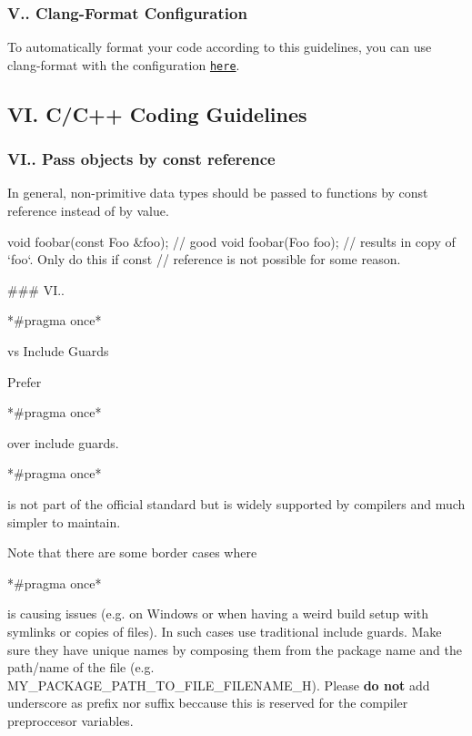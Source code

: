 \subsubsection*{V.. Clang-\/\+Format Configuration}

To automatically format your code according to this guidelines, you can use clang-\/format with the configuration \href{https://github.com/machines-in-motion/mpi_cmake_modules/blob/master/python/mpi_cmake_modules/_clang-format}{\tt here}.

\subsection*{VI. C/\+C++ Coding Guidelines}

\subsubsection*{V\+I.. Pass objects by const reference}

In general, non-\/primitive data types should be passed to functions by const reference instead of by value.


\begin{DoxyCode}
\textcolor{keywordtype}{void} foobar(\textcolor{keyword}{const} Foo &foo);  \textcolor{comment}{// good}
\textcolor{keywordtype}{void} foobar(Foo foo);  \textcolor{comment}{// results in copy of `foo`. Only do this if const}
                       \textcolor{comment}{// reference is not possible for some reason.}
\end{DoxyCode}


\#\#\# V\+I..
\begin{DoxyCode}
*#pragma once* 
\end{DoxyCode}
 vs Include Guards

Prefer
\begin{DoxyCode}
*#pragma once* 
\end{DoxyCode}
 over include guards. 
\begin{DoxyCode}
*#pragma once* 
\end{DoxyCode}
 is not part of the official standard but is widely supported by compilers and much simpler to maintain.

Note that there are some border cases where
\begin{DoxyCode}
*#pragma once* 
\end{DoxyCode}
 is causing issues (e.\+g. on Windows or when having a weird build setup with symlinks or copies of files). In such cases use traditional include guards. Make sure they have unique names by composing them from the package name and the path/name of the file (e.\+g. M\+Y\+\_\+\+P\+A\+C\+K\+A\+G\+E\+\_\+\+P\+A\+T\+H\+\_\+\+T\+O\+\_\+\+F\+I\+L\+E\+\_\+\+F\+I\+L\+E\+N\+A\+M\+E\+\_\+H). Please {\bfseries do not} add underscore as prefix nor suffix beccause this is reserved for the compiler preproccesor variables.

